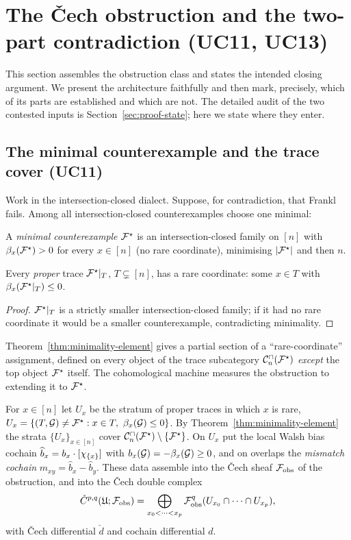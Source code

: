 \section{The \v{C}ech obstruction and the two-part contradiction (UC11, UC13)}
\label{sec:obstruction}

This section assembles the obstruction class and states the intended
closing argument. We present the architecture faithfully and then mark,
precisely, which of its parts are established and which are not. The
detailed audit of the two contested inputs is
Section~\ref{sec:proof-state}; here we state where they enter.

\subsection{The minimal counterexample and the trace cover (UC11)}
\label{ssec:trace-cover}

Work in the intersection-closed dialect. Suppose, for contradiction,
that Frankl fails. Among all intersection-closed counterexamples choose
one minimal:

\begin{definition}
\label{def:minimal-cex}
A \emph{minimal counterexample} $\mathcal{F}^{\star}$ is an intersection-closed
family on $[n]$ with $\beta_x(\mathcal{F}^{\star})>0$ for every $x\in[n]$ (no rare
coordinate), minimising $|\mathcal{F}^{\star}|$ and then $n$.
\end{definition}

\begin{theorem}
\label{thm:minimality-element}
Every \emph{proper} trace $\mathcal{F}^{\star}|_T$, $T\subsetneq[n]$, has a rare
coordinate: some $x\in T$ with $\beta_x(\mathcal{F}^{\star}|_T)\le0$.
\end{theorem}

\begin{proof}
$\mathcal{F}^{\star}|_T$ is a strictly smaller intersection-closed family; if it had
no rare coordinate it would be a smaller counterexample, contradicting
minimality.
\end{proof}

Theorem~\ref{thm:minimality-element} gives a partial section of a
``rare-coordinate'' assignment, defined on every object of the trace
subcategory $\mathcal{C}^{\cap}_n(\mathcal{F}^{\star})$ \emph{except} the top object $\mathcal{F}^{\star}$ itself.
The cohomological machine measures the obstruction to extending it to
$\mathcal{F}^{\star}$.

\begin{definition}
\label{def:cech-sheaf}
For $x\in[n]$ let $U_x$ be the stratum of proper traces in which $x$ is
rare, $U_x=\{(T,\G)\neq\Fstar:x\in T,\ \bias_x(\G)\le0\}$. By
Theorem~\ref{thm:minimality-element} the strata $\{U_x\}_{x\in[n]}$
cover $\mathcal{C}^{\cap}_n(\mathcal{F}^{\star})\setminus\{\mathcal{F}^{\star}\}$. On $U_x$ put the local Walsh
bias cochain $\widehat b_x=b_x\cdot[\chi_{\{x\}}]$ with
$b_x(\mathcal{G})=-\beta_x(\mathcal{G})\ge0$, and on overlaps the \emph{mismatch cochain}
$m_{xy}=\widehat b_x-\widehat b_y$. These data assemble into the
\v{C}ech sheaf $\mathcal{F}_{\mathrm{obs}}$ of the obstruction, and into the \v{C}ech
double complex
\[
  \check C^{p,q}(\mathfrak U;\mathcal{F}_{\mathrm{obs}})=\bigoplus_{x_0<\cdots<x_p}
  \mathcal{F}_{\mathrm{obs}}^{q}(U_{x_0}\cap\cdots\cap U_{x_p}),
\]
with \v{C}ech differential $\check d$ and cochain differential $d$.
\end{definition}

